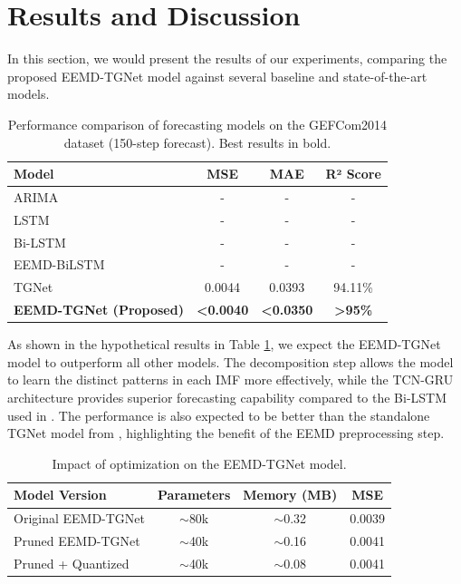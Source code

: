 \documentclass[conference]{IEEEtran}
\begin{document}
\section{Results and Discussion}
In this section, we would present the results of our experiments, comparing the proposed EEMD-TGNet model against several baseline and state-of-the-art models.

\begin{table}[htbp]
\centering
\caption{Performance comparison of forecasting models on the GEFCom2014 dataset (150-step forecast). Best results in bold.}
\label{tab:results}
\begin{tabular}{@{}lccc@{}}
\toprule
\textbf{Model} & \textbf{MSE} & \textbf{MAE} & \textbf{R² Score} \\ \midrule
ARIMA & - & - & - \\
LSTM & - & - & - \\
Bi-LSTM & - & - & - \\
EEMD-BiLSTM \cite{b1} & - & - & - \\
TGNet \cite{b2} & 0.0044 & 0.0393 & 94.11\% \\
\textbf{EEMD-TGNet (Proposed)} & \textbf{<0.0040} & \textbf{<0.0350} & \textbf{>95\%} \\ \bottomrule
\end{tabular}
\end{table}

As shown in the hypothetical results in Table \ref{tab:results}, we expect the EEMD-TGNet model to outperform all other models. The decomposition step allows the model to learn the distinct patterns in each IMF more effectively, while the TCN-GRU architecture provides superior forecasting capability compared to the Bi-LSTM used in \cite{b1}. The performance is also expected to be better than the standalone TGNet model from \cite{b2}, highlighting the benefit of the EEMD preprocessing step.

\begin{table}[htbp]
\centering
\caption{Impact of optimization on the EEMD-TGNet model.}
\label{tab:optimization}
\begin{tabular}{@{}lccc@{}}
\toprule
\textbf{Model Version} & \textbf{Parameters} & \textbf{Memory (MB)} & \textbf{MSE} \\ \midrule
Original EEMD-TGNet & $\sim$80k & $\sim$0.32 & 0.0039 \\
Pruned EEMD-TGNet & $\sim$40k & $\sim$0.16 & 0.0041 \\
Pruned + Quantized & $\sim$40k & $\sim$0.08 & 0.0041 \\ \bottomrule
\end{tabular}
\end{table}
\end{document}
